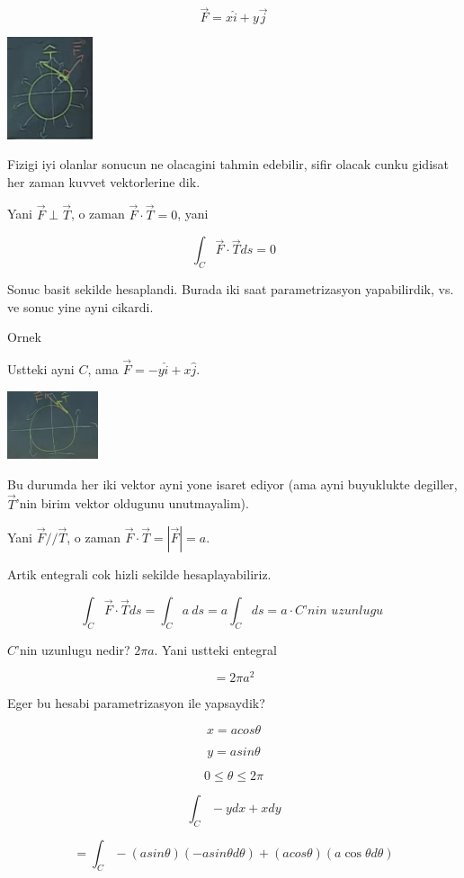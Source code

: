 \documentclass[12pt,fleqn]{article}\usepackage{../common}
\begin{document}
\[ \vec{F} = x\hat{i} + y\vec{j} \]

\includegraphics[height=3cm]{19_13.png}

Fizigi iyi olanlar sonucun ne olacagini tahmin edebilir, sifir olacak cunku
gidisat her zaman kuvvet vektorlerine dik. 

Yani $\vec{F} \perp \vec{T}$, o zaman $\vec{F} \cdot \vec{T} = 0$, yani

\[  \int_C \vec{F} \cdot \vec{T} ds = 0\]

Sonuc basit sekilde hesaplandi. Burada iki saat parametrizasyon
yapabilirdik, vs. ve sonuc yine ayni cikardi. 

Ornek

Ustteki ayni $C$, ama $\vec{F} = -y\hat{i} + x\hat{j}$. 

\includegraphics[height=2cm]{19_14.png}

Bu durumda her iki vektor ayni yone isaret ediyor (ama ayni buyuklukte
degiller, $\vec{T}$'nin birim vektor oldugunu unutmayalim). 

Yani $\vec{F} // \vec{T}$, o zaman $\vec{F} \cdot \vec{T} = |\vec{F}| =
a$.

Artik entegrali cok hizli sekilde hesaplayabiliriz. 

\[  \int_C \vec{F} \cdot \vec{T} ds 
=  \int_C a \ ds 
= a  \int_C ds 
= a \cdot C \textit{'nin uzunlugu }
\]

$C$'nin uzunlugu nedir? $2\pi a$. Yani ustteki entegral

\[ = 2\pi a^2 \]

Eger bu hesabi parametrizasyon ile yapsaydik? 

\[ x = acos\theta \]

\[ y = asin\theta \]

\[ 0 \le \theta \le 2\pi \]

\[ \int_C -y dx + x dy \]


\[ = \int_C -(asin\theta)(-asin\theta d\theta) + 
(acos\theta)(a \cos\theta d\theta)
\]
\end{document}
